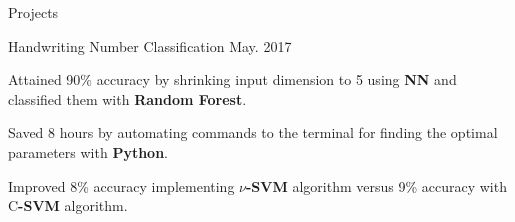 \documentclass{resume} %
\begin{document}
\begin{rSection}{Projects}
\begin{rSubsection}{Handwriting Number Classification}{ May. 2017}{}{}
\item Attained 90\% accuracy by shrinking input dimension to 5 using \textbf{NN} and classified them with \textbf{Random Forest}. 
\item Saved 8 hours by automating commands to the terminal for finding the optimal parameters with \textbf{Python}.
\item Improved 8\% accuracy implementing \textbf{$\nu$-SVM} algorithm versus 9\% accuracy with C\textbf{-SVM} algorithm.
\end{rSubsection}
 
\end{rSection}






\end{document}
